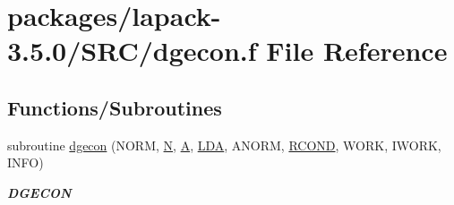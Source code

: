 \hypertarget{dgecon_8f}{}\section{packages/lapack-\/3.5.0/\+S\+R\+C/dgecon.f File Reference}
\label{dgecon_8f}
\subsection*{Functions/\+Subroutines}
\begin{DoxyCompactItemize}
\item 
subroutine \hyperlink{group__doubleGEcomputational_ga188b8d30443d14b1a3f7f8331d87ae60}{dgecon} (N\+O\+R\+M, \hyperlink{polmisc_8c_a0240ac851181b84ac374872dc5434ee4}{N}, \hyperlink{classA}{A}, \hyperlink{example__user_8c_ae946da542ce0db94dced19b2ecefd1aa}{L\+D\+A}, A\+N\+O\+R\+M, \hyperlink{superlu__enum__consts_8h_af00a42ecad444bbda75cde1b64bd7e72a9b5c151728d8512307565994c89919d5}{R\+C\+O\+N\+D}, W\+O\+R\+K, I\+W\+O\+R\+K, I\+N\+F\+O)
\begin{DoxyCompactList}\small\item\em {\bfseries D\+G\+E\+C\+O\+N} \end{DoxyCompactList}\end{DoxyCompactItemize}
